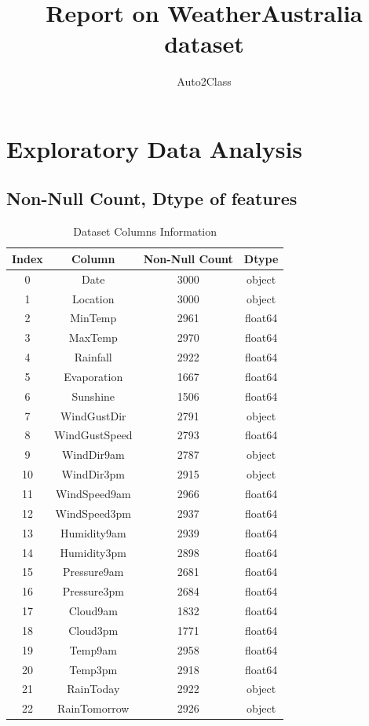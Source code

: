 \documentclass{article}%
\title{Report on WeatherAustralia dataset}%
\author{Auto2Class}%
\begin{document}
%
\normalsize%
\maketitle%
\newpage%
\tableofcontents%
\newpage%
\section{Exploratory Data Analysis}%
\label{sec:ExploratoryDataAnalysis}%
\subsection{Non{-}Null Count, Dtype of features}%
\label{subsec:Non{-}NullCount,Dtypeoffeatures}%


\begin{table}[h!]%
\caption{Dataset Columns Information}%
\vspace{0.2cm}%
\centering%
\begin{tabular}{|c||c||c||c|}%
\hline%
Index&Column&Non{-}Null Count&Dtype\\%
\hline%
0&Date&3000&object\\%
1&Location&3000&object\\%
2&MinTemp&2961&float64\\%
3&MaxTemp&2970&float64\\%
4&Rainfall&2922&float64\\%
5&Evaporation&1667&float64\\%
6&Sunshine&1506&float64\\%
7&WindGustDir&2791&object\\%
8&WindGustSpeed&2793&float64\\%
9&WindDir9am&2787&object\\%
10&WindDir3pm&2915&object\\%
11&WindSpeed9am&2966&float64\\%
12&WindSpeed3pm&2937&float64\\%
13&Humidity9am&2939&float64\\%
14&Humidity3pm&2898&float64\\%
15&Pressure9am&2681&float64\\%
16&Pressure3pm&2684&float64\\%
17&Cloud9am&1832&float64\\%
18&Cloud3pm&1771&float64\\%
19&Temp9am&2958&float64\\%
20&Temp3pm&2918&float64\\%
21&RainToday&2922&object\\%
22&RainTomorrow&2926&object\\%
\hline%
\end{tabular}%
\end{table}
\end{document}
